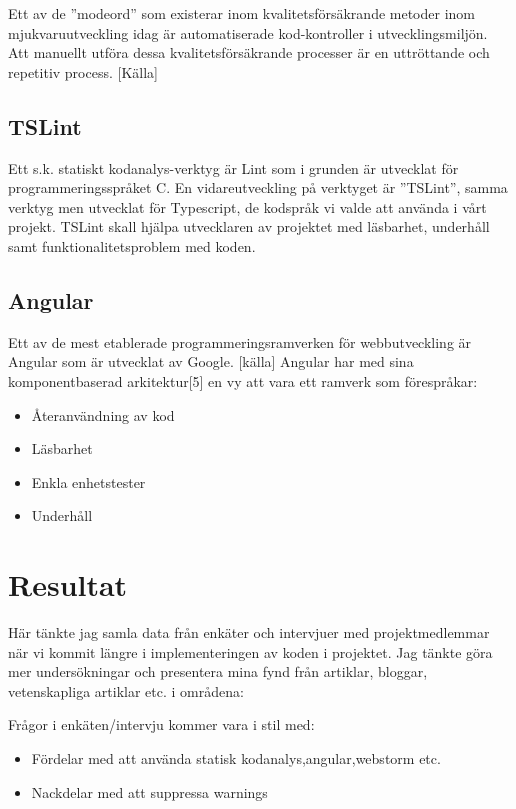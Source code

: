 Ett av de ”modeord” som existerar inom kvalitetsförsäkrande metoder inom mjukvaruutveckling idag är automatiserade kod-kontroller i utvecklingsmiljön. Att manuellt utföra dessa kvalitetsförsäkrande processer är en uttröttande och repetitiv process. [Källa]

\subsection{TSLint}
Ett s.k. statiskt kodanalys-verktyg är Lint som i grunden är utvecklat för programmeringsspråket C. En vidareutveckling på verktyget är ”TSLint”, samma verktyg men utvecklat för Typescript, de kodspråk vi valde att använda i vårt projekt. TSLint skall hjälpa utvecklaren av projektet med läsbarhet, underhåll samt funktionalitetsproblem med koden.

\subsection{Angular}
Ett av de mest etablerade programmeringsramverken för webbutveckling är Angular som är utvecklat av Google. [källa] Angular har med sina komponentbaserad arkitektur[5] en vy att vara ett ramverk som förespråkar:

\begin{itemize}
	\item Återanvändning av kod
	\item Läsbarhet
	\item Enkla enhetstester
	\item Underhåll
\end{itemize}

\section{Resultat}
Här tänkte jag samla data från enkäter och intervjuer med projektmedlemmar när vi kommit längre i implementeringen av koden i projektet.
Jag tänkte göra mer undersökningar och presentera mina fynd från artiklar, bloggar, vetenskapliga artiklar etc. i områdena: 

Frågor i enkäten/intervju kommer vara i stil med:


\begin{itemize}
	\item Fördelar med att använda statisk kodanalys,angular,webstorm etc. 
	\item Nackdelar med att suppressa warnings 
\end{itemize}

